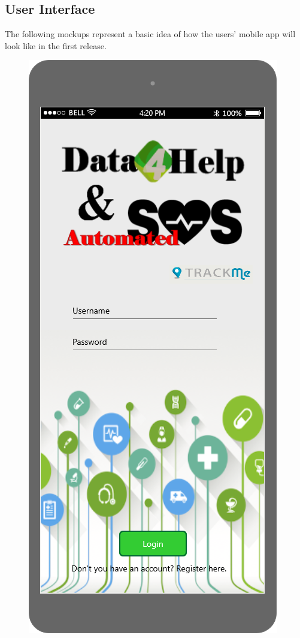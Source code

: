 \subsection{User Interface}

The following mockups represent a basic idea of how the users' mobile app will look like in the first 
release. 

\begin{figure}[h!]
	\centering
 	 \begin{minipage}[b]{0.25\textwidth}
    		\includegraphics[width=\textwidth]{./pictures/login_user.png}

\end{minipage}
\end{figure}
